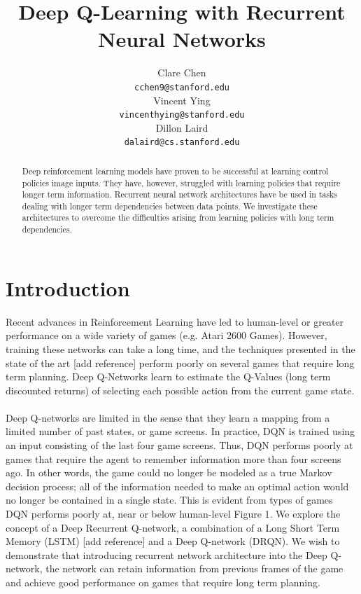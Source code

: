 \documentclass{article}
\title{Deep Q-Learning with Recurrent Neural Networks}
\author{
  Clare Chen \\
  \texttt{cchen9@stanford.edu} \\
  \And
  Vincent Ying \\
  \texttt{vincenthying@stanford.edu} \\
  \And
  Dillon Laird \\
  \texttt{dalaird@cs.stanford.edu} \\
}
\begin{document}

\maketitle

\begin{abstract}
  Deep reinforcement learning models have proven to be successful at learning
  control policies image inputs. They have, however, struggled with learning
  policies that require longer term information. Recurrent neural network
  architectures have be used in tasks dealing with longer term dependencies
  between data points. We investigate these architectures to overcome the
  difficulties arising from learning policies with long term dependencies.
\end{abstract}

\section{Introduction}
    Recent advances in Reinforcement Learning have led to human-level or greater
    performance on a wide variety of games (e.g. Atari 2600 Games).  However,
    training these networks can take a long time, and the techniques presented in
    the state of the art [add reference] perform poorly on several games that
    require long term planning.  Deep Q-Networks learn to estimate the Q-Values
    (long term discounted returns) of selecting each possible action from the
    current game state. \\
    \\
    Deep Q-networks are limited in the sense that they learn a mapping from a
    limited number of past states, or game screens.  In practice, DQN is trained
    using an input consisting of the last four game screens.  Thus, DQN performs
    poorly at games that require the agent to remember information more than four
    screens ago.  In other words, the game could no longer be modeled as a true
    Markov decision process; all of the information needed to make an optimal
    action would no longer be contained in a single state. This is evident from
    types of games DQN performs poorly at, near or below human-level Figure 1. We
    explore the concept of a Deep Recurrent Q-network, a combination of a Long
    Short Term Memory (LSTM) [add reference] and a Deep Q-network (DRQN).  We wish
    to demonstrate that introducing recurrent network architecture into the Deep
    Q-network, the network can retain information from previous frames of the
    game and achieve good performance on games that require long term planning. \\
\end{document}
